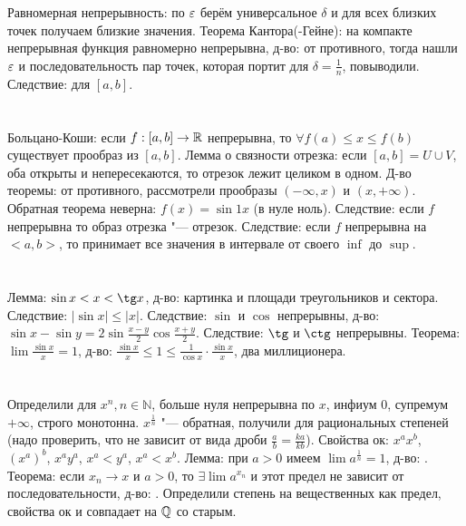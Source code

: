 \section{} %
Равномерная непрерывность: по $\varepsilon$ берём универсальное $\delta$ и для
всех близких точек получаем близкие значения.
Теорема Кантора(-Гейне): на компакте непрерывная функция равномерно непрерывна,
д-во: от противного, тогда нашли $\varepsilon$ и последовательность пар точек,
которая портит для $\delta=\frac1n$, повыводили.
Следствие: для $[a,b]$.

\section{} %
Больцано-Коши: если $f:[a,b]\to\mathbb{R}$ непрерывна, то $\forall f(a) \le x \le f(b)$ существует
прообраз из $[a,b]$. Лемма о связности отрезка: если $[a,b]=U\cup V$, оба открыты и непересекаются,
то отрезок лежит целиком в одном. Д-во теоремы: от противного, рассмотрели
прообразы $(-\infty, x)$ и $(x, +\infty)$. Обратная теорема неверна: $f(x)=\sin1x$ (в нуле ноль).
Следствие: если $f$ непрерывна то образ отрезка "--- отрезок.
Следствие: если $f$ непрерывна на $<a,b>$, то принимает все значения в интервале от своего $\inf$ до $\sup$.

\section{} %
Лемма: $\sin x < x < \tg x$, д-во: картинка и площади треугольников и сектора. Следствие: $|\sin x| \le |x|$.
Следствие: $\sin$ и $\cos$ непрерывны, д-во: $\sin x - \sin y = 2\sin\frac{x-y}{2}\cos\frac{x+y}{2}$.
Следствие: $\tg$ и $\ctg$ непрерывны.
Теорема: $\lim \frac{\sin x}{x} = 1$, д-во: $\frac{\sin x}{x} \le 1 \le \frac{1}{\cos x} \cdot \frac{\sin x}{x}$,
два миллиционера.

\section{} %
Определили для $x^n, n\in\mathbb{N}$, больше нуля непрерывна по $x$, инфиум 0, супремум $+\infty$,
строго монотонна. $x^{\frac1n}$ "--- обратная, получили для рациональных степеней (надо проверить,
что не зависит от вида дроби $\frac ab=\frac{ka}{kb}$). Свойства ок: $x^ax^b$, $(x^a)^b$, $x^ay^a$,
$x^a<y^a$, $x^a<x^b$.
Лемма: при $a>0$ имеем $\lim a^{\frac 1 n}=1$, д-во: \TODO.
Теорема: если $x_n \to x$ и $a>0$, то $\exists \lim a^{x_n}$ и этот предел не зависит от последовательности, д-во: \TODO.
Определили степень на вещественных как предел, свойства ок и совпадает на $\mathbb{Q}$ со старым.

